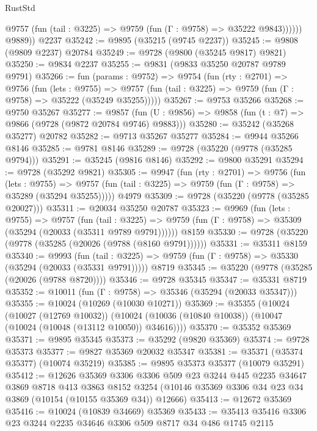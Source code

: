 \begin{lexlean}{RustStd}
\begin{coremodule}
              @9757 (fun (tail : @3225) => @9759 (fun (Γ : @9758) => @35222 @9843))))))
        @9889))
    @2237
@35242 := @9895 (@35215 (@9745 @2237))
@35245 := @9808 (@9809 @2237) @20784
@35249 := @9728 (@9800 (@35245 @9817) @9821)
@35250 := @9834 @2237
@35255 := @9831 (@9833 @35250 @20787 @9789 @9791)
@35266 := fun (params : @9752) =>
  @9754
    (fun (rty : @2701) =>
    @9756
      (fun (lets : @9755) =>
      @9757 (fun (tail : @3225) => @9759 (fun (Γ : @9758) => @35222 (@35249 @35255)))))
@35267 := @9753 @35266
@35268 := @9750 @35267
@35277 := @9857
    (fun (U : @9856) => @9858 (fun (t : @7) => @9866 (@9728 (@9872 @20784 @9746) @9883)))
@35280 := @35242 (@35268 @35277) @20782
@35282 := @9713 @35267 @35277
@35284 := @9944 @35266 @8146
@35285 := @9781 @8146
@35289 := @9728 (@35220 (@9778 (@35285 @9794)))
@35291 := @35245 (@9816 @8146)
@35292 := @9800 @35291
@35294 := @9728 (@35292 @9821)
@35305 := @9947
    (fun (rty : @2701) =>
    @9756
      (fun (lets : @9755) =>
      @9757 (fun (tail : @3225) => @9759 (fun (Γ : @9758) => @35289 (@35294 @35255)))))
    @4979
@35309 := @9728 (@35220 (@9778 (@35285 @20027)))
@35311 := @20034 @35250 @20787
@35323 := @9969
    (fun (lets : @9755) =>
    @9757
      (fun (tail : @3225) =>
      @9759 (fun (Γ : @9758) => @35309 (@35294 (@20033 (@35311 @9789 @9791))))))
    @8159
@35330 := @9728 (@35220 (@9778 (@35285 (@20026 (@9788 (@8160 @9791))))))
@35331 := @35311 @8159
@35340 := @9993
    (fun (tail : @3225) => @9759 (fun (Γ : @9758) => @35330 (@35294 (@20033 (@35331 @9791)))))
    @8719
@35345 := @35220 (@9778 (@35285 (@20026 (@9788 @8720))))
@35346 := @9728 @35345
@35347 := @35331 @8719
@35352 := @10011 (fun (Γ : @9758) => @35346 (@35294 (@20033 @35347)))
@35355 := @10024 (@10269 (@10030 @10271))
@35369 := @35355
    (@10024
      (@10027 (@12769 @10032))
      (@10024 (@10036 (@10840 @10038)) (@10047 (@10024 (@10048 (@13112 @10050)) @34616))))
@35370 := @35352 @35369
@35371 := @9895 @35345
@35373 := @35292 (@9820 @35369)
@35374 := @9728 @35373
@35377 := @9827 @35369 @20032 @35347
@35381 := @35371 (@35374 @35377) (@10074 @35219)
@35385 := @9895 @35373 @35377 (@10079 @35291)
@35412 := @12626
    @35369
    @3306
    @3306
    @509
    @23
    @3244
    @445
    @2235
    @34647
    @3869
    @8718
    @413
    @3863
    @8152
    @3254
    (@10146 @35369 @3306 @34 @23 @34 @3869 (@10154 (@10155 @35369 @34)) @12666)
@35413 := @12672 @35369
@35416 := @10024 (@10839 @34669) @35369
@35433 := @35413
    @35416
    @3306
    @23
    @3244
    @2235
    @34646
    @3306
    @509
    @8717
    @34
    @486
    @1745
    @2115

\end{coremodule}
\end{lexlean}
